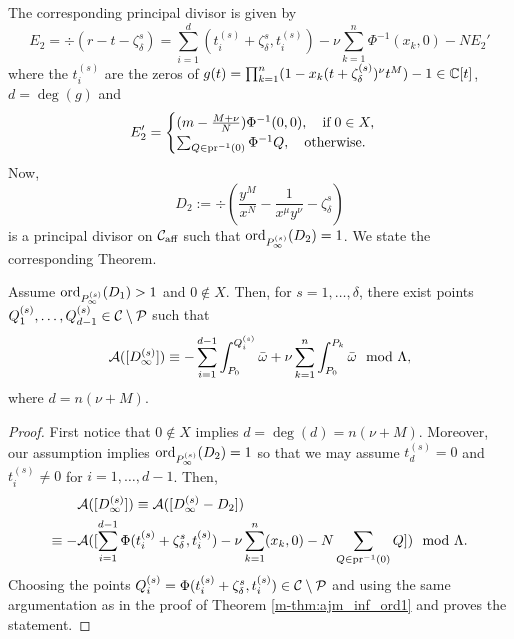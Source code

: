 \documentclass[main.tex]{subfiles}
\begin{document}
    The corresponding principal divisor is given by
     \begin{equation}
      E_2 = \div(r - t - \zeta_{\delta}^s) = \sum_{i = 1}^{d} (t_i^{(s)}+\zeta_{\delta}^s,t_i^{(s)}) - \nu \sum_{k=1}^n
      \Phi^{-1}(x_k,0)- N E_2'
   \end{equation}
      where the $t_i^{(s)}$ are the zeros of $g(t) = \prod_{k=1}^n (1-x_k(t+\zeta_{\delta}^{(s)})^{\nu}t^M) - 1 \in \mathbb{C}[t]$, $d = \deg(g)$ and
    \begin{equation}\label{eq:zero_bp2}
       E_2' = \begin{cases}
	   (m-\frac{M+\nu}{N}) \Phi^{-1}(0,0), \quad \text{if} \; 0 \in X, \\
             \sum_{Q \in \operatorname{pr}^{-1}(0)} \Phi^{-1}Q, \quad \text{otherwise.}
             \end{cases}
    \end{equation}
    Now, 
    \begin{equation}
     D_2 := \div \left( \frac{y^M}{x^N} - \frac{1}{x^{\mu}y^{\nu}} - \zeta_{\delta}^s \right)
    \end{equation}
    is a principal divisor on $\mathcal{C}_{\text{aff}}$ such that
    $\operatorname{ord}_{P_{\infty}^{(s)}}(D_2) = 1$. We state the corresponding Theorem.
    
    \begin{thm}\label{thm:ajm_inf_ordgt1}
      Assume $\operatorname{ord}_{P_{\infty}^{(s)}}(D_1) > 1$ and $0 \not\in X$. Then, for $s = 1,\dots,\delta$, there exist points $Q_1^{(s)},\dots,Q_{d-1}^{(s)} \in \mathcal{C} \setminus \mathcal{P}$ such that
    \begin{equation}\label{eq:ajm_int_ord0}
       \mathcal{A}( [D_{\infty}^{(s)}] ) \equiv -\sum_{i = 1}^{d-1} \int_{P_0}^{Q_i^{(s)}} \bar{\omega} + \nu \sum_{k=1}^n
      \int_{P_0}^{P_k} \bar{\omega} \mod \Lambda,
    \end{equation}
    where $d = n(\nu+M)$.
    \end{thm}
   \begin{proof}
    First notice that $0 \not\in X$ implies $d = \deg(d) = n(\nu+M)$. Moreover, our assumption implies $\operatorname{ord}_{P_{\infty}^{(s)}}(D_2) = 1$ so that we may assume
    $t_d^{(s)} = 0$ and $t_i^{(s)} \ne 0$ for $i=1,\dots,d-1$. 	Then,
    \begin{align}
     & \mathcal{A}( [D_{\infty}^{(s)}] ) \equiv  \mathcal{A}([D_{\infty}^{(s)} - D_2])  \\
      \equiv  -&\mathcal{A}( [\sum_{i = 1}^{d-1} \Phi(t_i^{(s)}+\zeta_{\delta}^s,t_i^{(s)}) - \nu \sum_{k=1}^n
      (x_k,0) - N \sum_{Q \in \operatorname{pr}^{-1}(0)} Q ] )
       \mod \Lambda.
    \end{align}
   Choosing the points 
    $Q_i^{(s)} = \Phi(t_i^{(s)}+\zeta_{\delta}^s,t_i^{(s)}) \in \mathcal{C} \setminus \mathcal{P}$ and
     using the same argumentation as in the proof of Theorem \ref{m-thm:ajm_inf_ord1} and 
    proves the statement.
     \end{proof}
    
\end{document}
